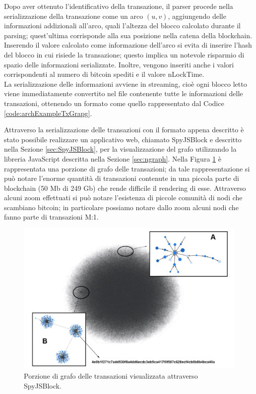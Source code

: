 \begin{example}
Dopo aver ottenuto l'identificativo della transazione, il parser procede nella serializzazione della transazione come un arco $(u, v)$, aggiungendo delle informazioni addizionali all'arco, quali  l'altezza del blocco calcolato durante il parsing; quest'ultima corrisponde alla sua posizione nella catena della blockchain.
Inserendo il valore calcolato come informazione dell'arco si evita di inserire l'hash del blocco in cui risiede la transazione; questo implica un notevole risparmio di spazio delle informazioni serializzate. Inoltre, vengono inseriti anche i valori corrispondenti al numero di bitcoin spediti e il valore nLockTime.\\
La serializzazione delle informazioni avviene in streaming, cioè ogni blocco letto viene immediatamente convertito nel file contenente tutte le informazioni delle transazioni, ottenendo un formato come quello rappresentato dal Codice \ref{code:archExampleTxGrapg}.\\



\end{example}

Attraverso la serializzazione delle transazioni con il formato appena descritto è stato possibile realizzare un applicativo web, chiamato SpyJSBlock e descritto nella Sezione \ref{sec:SpyJSBlock}, per la visualizzazione del grafo utilizzando la libreria JavaScript descritta nella Sezione \ref{sec:ngraph}. Nella Figura \ref{fig:visgraphTx} è rappresentata una porzione di grafo delle transazioni; da tale rappresentazione si può notare  l'enorme quantità di transazioni contenute in una piccola parte di blockchain (50 Mb di 249 Gb) che rende difficile il rendering di esse.
Attraverso alcuni zoom effettuati si può notare l'esistenza di piccole comunità di nodi che scambiano bitcoin; in particolare possiamo notare dallo zoom  alcuni nodi che fanno parte di transazioni M:1.

\begin{figure}
\centering
\includegraphics[scale=0.25]{images/demo/graph_tx_demo_presentation.png}
\caption{Porzione di grafo delle transazioni visualizzata attraverso SpyJSBlock.}
\label{fig:visgraphTx}
\end{figure}

